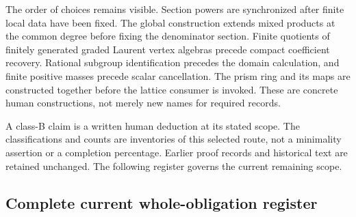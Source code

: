The order of choices remains visible. Section powers are synchronized
after finite local data have been fixed. The global construction extends
mixed products at the common degree before fixing the denominator section.
Finite quotients of finitely generated graded Laurent vertex algebras
precede compact coefficient recovery. Rational subgroup identification
precedes the domain calculation, and finite positive masses precede
scalar cancellation. The prism ring and its maps are constructed
together before the lattice consumer is invoked. These are concrete
human constructions, not merely new names for required records.

A class-B claim is a written human deduction at its stated scope.
The classifications and counts are inventories of this selected route,
not a minimality assertion or a completion percentage. Earlier proof
records and historical text are retained unchanged. The following
register governs the current remaining scope.

\subsection{Complete current whole-obligation register}
